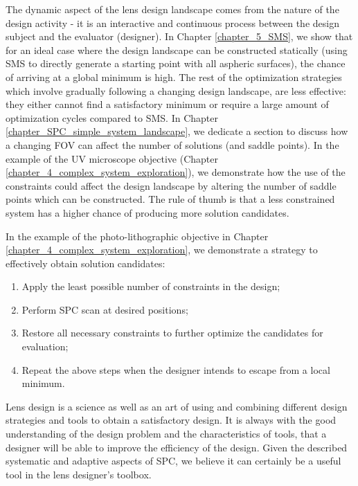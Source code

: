 The dynamic aspect of the lens design landscape comes from the nature of the design activity - it is an interactive and continuous process between the design subject and the evaluator (designer). In Chapter \ref{chapter_5_SMS}, we show that for an ideal case where the design landscape can be constructed statically (using SMS to directly generate a starting point with all aspheric surfaces), the chance of arriving at a global minimum is high. The rest of the optimization strategies which involve gradually following a changing design landscape, are less effective: they either cannot find a satisfactory minimum or require a large amount of optimization cycles compared to SMS. In Chapter \ref{chapter_SPC_simple_system_landscape}, we dedicate a section to discuss how a changing FOV can affect the number of solutions (and saddle points). In the example of the UV microscope objective (Chapter \ref{chapter_4_complex_system_exploration}), we demonstrate how the use of the constraints could affect the design landscape by altering the number of saddle points which can be constructed. The rule of thumb is that a less constrained system has a higher chance of producing more solution candidates. 

In the example of the photo-lithographic objective in Chapter \ref{chapter_4_complex_system_exploration}, we demonstrate a strategy to effectively obtain solution candidates:

\begin{enumerate}[nosep]
\item Apply the least possible number of constraints in the design;
\item Perform SPC scan at desired positions;
\item Restore all necessary constraints to further optimize the candidates for evaluation; 
\item Repeat the above steps when the designer intends to escape from a local minimum.
\end{enumerate}


Lens design is a science as well as an art of using and combining different design strategies and tools to obtain a satisfactory design. It is always with the good understanding of the design problem and the characteristics of tools, that a designer will be able to improve the efficiency of the design. Given the described systematic and adaptive aspects of SPC, we believe it can certainly be a useful tool in the lens designer's toolbox.  

